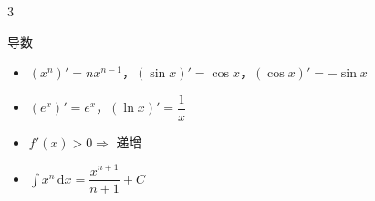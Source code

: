 \begin{multicols}{3}
\begin{fastcard}{导数}
\begin{itemize}[leftmargin=1.2em, topsep=0.2ex, itemsep=0.1ex, parsep=0pt]
\item $(x^n)'=nx^{n-1}$，$(\sin x)'=\cos x$，$(\cos x)'=-\sin x$
\item $(e^x)'=e^x$，$(\ln x)'=\dfrac1x$
\item $f'(x)>0\Rightarrow$ 递增
\item $\displaystyle\int x^n\,\mathrm{d}x=\dfrac{x^{n+1}}{n+1}+C$
\end{itemize}
\end{fastcard}

\end{multicols}
